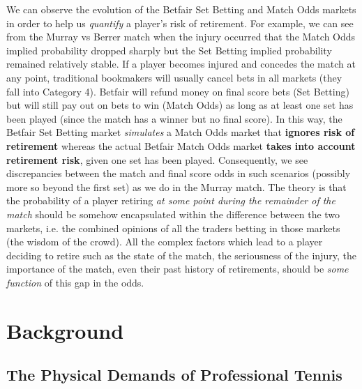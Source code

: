 \documentclass[letterpaper,12pt]{article}
\begin{document}
We can observe the evolution of the Betfair Set Betting and Match Odds markets in order to help us \textit{quantify} a player's risk of retirement.  For example, we can see from the Murray vs Berrer match when the injury occurred that the Match Odds implied probability dropped sharply but the Set Betting implied probability remained relatively stable.  If a player becomes injured and concedes the match at any point, traditional bookmakers will usually cancel bets in all markets (they fall into Category 4).  Betfair will refund money on final score bets (Set Betting) but will still pay out on bets to win (Match Odds) as long as at least one set has been played (since the match has a winner but no final score).  In this way, the Betfair Set Betting market \textit{simulates} a Match Odds market that \textbf{ignores risk of retirement} whereas the actual Betfair Match Odds market \textbf{takes into account retirement risk}, given one set has been played.  Consequently, we see discrepancies between the match and final score odds in such scenarios (possibly more so beyond the first set) as we do in the Murray match.  
The theory is that the probability of a player retiring \textit{at some point during the remainder of the match} should be somehow encapsulated within the difference between the two markets, i.e. the combined opinions of all the traders betting in those markets (the wisdom of the crowd).  All the complex factors which lead to a player deciding to retire such as the state of the match, the seriousness of the injury, the importance of the match, even their past history of retirements, should be \textit{some function} of this gap in the odds.

\section{Background}

\subsection{The Physical Demands of Professional Tennis}
\end{document}
